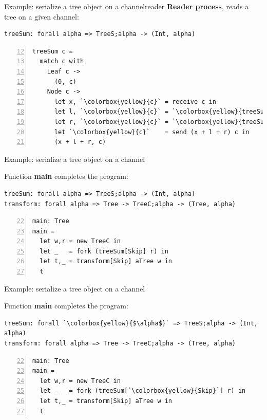 \documentclass[10pt]{beamer}
\begin{document}
\begin{frame}[fragile]{Example:  serialize a tree object on a channel\hfill{\color{mLightBrown}reader}}
	\textbf{Reader process}, reads a tree on a given channel:
	
\begin{lstlisting}
treeSum: forall alpha => TreeS;alpha -> (Int, alpha)
\end{lstlisting}

\label{lst:treeSum}
\begin{lstlisting}[numbers=left,firstnumber=12, xleftmargin=0.7cm, escapeinside=\`\`]
treeSum c =
  match c with
    Leaf c ->
      (0, c)
    Node c ->
      let x, `\colorbox{yellow}{c}` = receive c in
      let l, `\colorbox{yellow}{c}` = `\colorbox{yellow}{treeSum}`[TreeS;!Int;alpha] c in
      let r, `\colorbox{yellow}{c}` = `\colorbox{yellow}{treeSum}`[!Int;alpha] c in
      let `\colorbox{yellow}{c}`    = send (x + l + r) c in
      (x + l + r, c)
\end{lstlisting}

\end{frame}

\begin{frame}[fragile]{Example:  serialize a tree object on a channel}

Function \textbf{main} completes the program:

\begin{lstlisting}[escapeinside=\`\`]
treeSum: forall alpha => TreeS;alpha -> (Int, alpha)
transform: forall alpha => Tree -> TreeC;alpha -> (Tree, alpha)
\end{lstlisting}
\begin{lstlisting}[numbers=left,firstnumber=22, xleftmargin=0.7cm, escapeinside=\`\`]
main: Tree
main =
  let w,r = new TreeC in
  let _   = fork (treeSum[Skip] r) in
  let t,_ = transform[Skip] aTree w in
  t
\end{lstlisting}
\end{frame}


\begin{frame}[fragile]{Example:  serialize a tree object on a channel}

Function \textbf{main} completes the program:

\begin{lstlisting}[escapeinside=\`\`]
treeSum: forall `\colorbox{yellow}{$\alpha$}` => TreeS;alpha -> (Int, alpha)
transform: forall alpha => Tree -> TreeC;alpha -> (Tree, alpha)
\end{lstlisting}
\begin{lstlisting}[numbers=left,firstnumber=22, xleftmargin=0.7cm, escapeinside=\`\`]
main: Tree
main =
  let w,r = new TreeC in
  let _   = fork (treeSum[`\colorbox{yellow}{Skip}`] r) in
  let t,_ = transform[Skip] aTree w in
  t
\end{lstlisting}
\end{frame}
\end{document}
